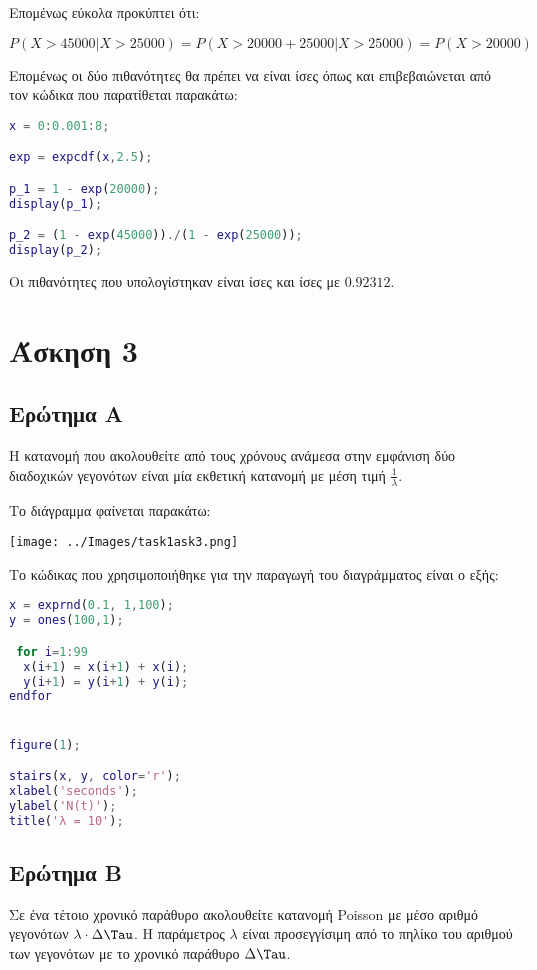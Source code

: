 \documentclass[12pt]{article}
\begin{document}
Επομένως εύκολα προκύπτει ότι:

\begin{equation}
    P(X > 45000 | X > 25000) = P(X > 20000 + 25000 | X > 25000) = P(X > 20000)
\end{equation}

Επομένως οι δύο πιθανότητες θα πρέπει να είναι ίσες όπως και επιβεβαιώνεται από τον κώδικα
που παρατίθεται παρακάτω:

\begin{lstlisting}[language=Matlab]
x = 0:0.001:8;

exp = expcdf(x,2.5);

p_1 = 1 - exp(20000);
display(p_1);

p_2 = (1 - exp(45000))./(1 - exp(25000));
display(p_2);
\end{lstlisting}

Οι πιθανότητες που υπολογίστηκαν είναι ίσες και ίσες με $0.92312$.



\pagebreak
\section{Άσκηση 3}

\subsection{Ερώτημα Α}
Η κατανομή που ακολουθείτε από τους χρόνους ανάμεσα στην εμφάνιση δύο διαδοχικών 
γεγονότων είναι μία εκθετική κατανομή με μέση τιμή $\frac{1}{\lambda}$.

Το διάγραμμα φαίνεται παρακάτω:

\begin{center}
    \texttt{[image: ../Images/task1ask3.png]}
\end{center}

Το κώδικας που χρησιμοποιήθηκε για την παραγωγή του διαγράμματος είναι ο εξής:

\begin{lstlisting}[language=Matlab]
x = exprnd(0.1, 1,100);
y = ones(100,1);

 for i=1:99
  x(i+1) = x(i+1) + x(i);
  y(i+1) = y(i+1) + y(i);
endfor


figure(1); 

stairs(x, y, color='r');
xlabel('seconds');
ylabel('N(t)');
title('λ = 10');

\end{lstlisting}


\subsection{Ερώτημα Β}
Σε ένα τέτοιο χρονικό παράθυρο ακολουθείτε κατανομή Poisson με μέσο αριθμό γεγονότων
$\lambda \cdot \Delta \Tau$. Η παράμετρος $\lambda$ είναι προσεγγίσιμη από το πηλίκο 
του αριθμού των γεγονότων με το χρονικό παράθυρο $\Delta \Tau$.\\
\end{document}
